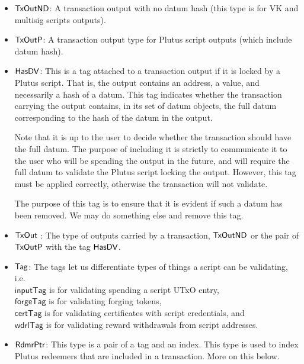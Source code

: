 \begin{itemize}
  \item $\mathsf{TxOutND}$: A transaction output with no datum hash
  (this type is for VK and multisig scripts outputs).

  \item $\mathsf{TxOutP}$: A transaction output type for Plutus
  script outputs (which include datum hash).

  \item $\mathsf{HasDV}$:
  This is a tag attached to a transaction output if it is locked by a Plutus
  script. That is, the output contains an address, a value, and necessarily a
  hash of a datum.
  This tag indicates whether the transaction carrying the output
  contains, in its set of datum objects, the full datum corresponding
  to the hash of the datum in the output.

  Note that it is up to the user
  to decide whether the transaction should have the full datum. The purpose of
  including it is strictly to communicate it to the user who will be spending
  the output in the future, and will require the full datum to validate
  the Plutus script locking the output. However, this tag must be applied
  correctly, otherwise the transaction will not validate.
  \begin{note}
    The purpose of this tag is to ensure that it is evident if such a
    datum has been removed. We may do something else and remove this tag.
  \end{note}
  
  \item $\mathsf{TxOut}$ : The type of outputs carried by a transaction,
  $\mathsf{TxOutND}$ or the pair of $\mathsf{TxOutP}$ with the tag $\mathsf{HasDV}$.

  \item $\mathsf{Tag}$: The tags let us differentiate types of things a script
  can be validating, i.e. \\
  $\mathsf{inputTag}$ is for validating spending a script UTxO entry, \\
  $\mathsf{forgeTag}$ is for validating forging tokens, \\
  $\mathsf{certTag}$  is for validating certificates with script credentials, and  \\
  $\mathsf{wdrlTag}$ is for validating reward withdrawals from script addresses.

  \item $\mathsf{RdmrPtr}$: This type is a pair of a tag and an index. This type is
  used to index Plutus redeemers that are included in a transaction. More on this
  below.

\end{itemize}


